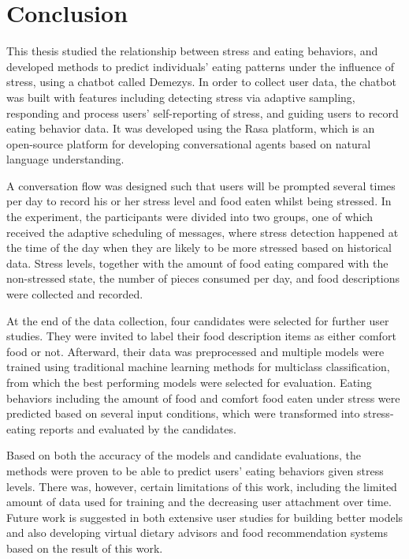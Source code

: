 
\chapter{Conclusion}\label{chapter:conclusion}
This thesis studied the relationship between stress and eating behaviors, and developed methods to predict individuals' eating patterns under the influence of stress, using a chatbot called Demezys. In order to collect user data, the chatbot was built with features including detecting stress via adaptive sampling, responding and process users' self-reporting of stress, and guiding users to record eating behavior data. It was developed using the Rasa platform, which is an open-source platform for developing conversational agents based on natural language understanding.

A conversation flow was designed such that users will be prompted several times per day to record his or her stress level and food eaten whilst being stressed. In the experiment, the participants were divided into two groups, one of which received the adaptive scheduling of messages, where stress detection happened at the time of the day when they are likely to be more stressed based on historical data. Stress levels, together with the amount of food eating compared with the non-stressed state, the number of pieces consumed per day, and food descriptions were collected and recorded.

At the end of the data collection, four candidates were selected for further user studies. They were invited to label their food description items as either comfort food or not. Afterward, their data was preprocessed and multiple models were trained using traditional machine learning methods for multiclass classification, from which the best performing models were selected for evaluation. Eating behaviors including the amount of food and comfort food eaten under stress were predicted based on several input conditions, which were transformed into stress-eating reports and evaluated by the candidates.

Based on both the accuracy of the models and candidate evaluations, the methods were proven to be able to predict users' eating behaviors given stress levels. There was, however, certain limitations of this work, including the limited amount of data used for training and the decreasing user attachment over time. Future work is suggested in both extensive user studies for building better models and also developing virtual dietary advisors and food recommendation systems based on the result of this work.

